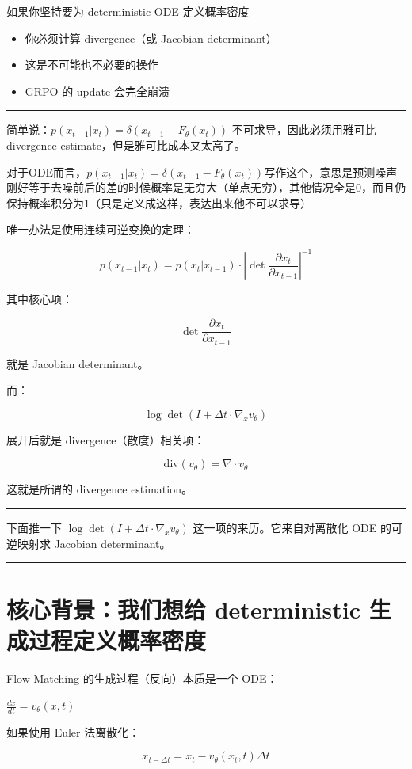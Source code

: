 如果你坚持要为 deterministic ODE 定义概率密度

\begin{itemize}
  \item 你必须计算 divergence（或 Jacobian determinant）
  \item 这是不可能也不必要的操作
  \item GRPO 的 update 会完全崩溃
\end{itemize}

\hrule

简单说：\(p(x_{t-1} | x_t) = \delta(x_{t-1}-F_\theta(x_t))\) 不可求导，因此必须用雅可比divergence estimate，但是雅可比成本又太高了。

对于ODE而言，\( p(x_{t-1} | x_t) = \delta(x_{t-1}-F_\theta(x_t)) \)写作这个，意思是预测噪声刚好等于去噪前后的差的时候概率是无穷大（单点无穷），其他情况全是0，而且仍保持概率积分为1（只是定义成这样，表达出来他不可以求导）

唯一办法是使用连续可逆变换的定理：

\[
p(x_{t-1} | x_t) = p(x_t | x_{t-1}) \cdot \left|\det \frac{\partial x_t}{\partial x_{t-1}}\right|^{-1}
\]

其中核心项：

\[
\det \frac{\partial x_t}{\partial x_{t-1}}
\]

就是 Jacobian determinant。

而：

\[
\log \det (I + \Delta t \cdot \nabla_x v_\theta)
\]

展开后就是 divergence（散度）相关项：

\[
\text{div}(v_\theta) = \nabla\cdot v_\theta
\]

这就是所谓的 divergence estimation。

\hrule

下面推一下 \(\log \det (I + \Delta t \cdot \nabla_x v_\theta)\) 这一项的来历。它来自对离散化 ODE 的可逆映射求 Jacobian determinant。

\hrule

\section{核心背景：我们想给 deterministic 生成过程定义概率密度}

Flow Matching 的生成过程（反向）本质是一个 ODE：

\(\frac{dx}{dt} = v_\theta(x,t)\)

如果使用 Euler 法离散化：

\[
x_{t-\Delta t} = x_t - v_\theta(x_t,t)\Delta t
\]


